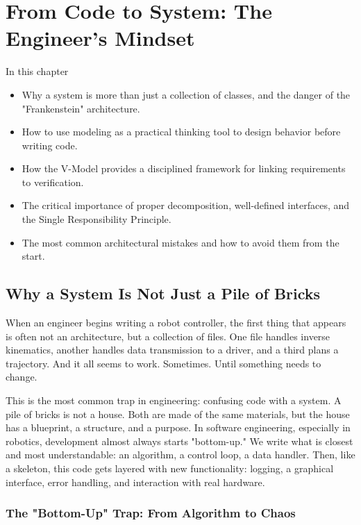 \chapter{From Code to System: The Engineer's Mindset}
\begin{navigationbox}{In this chapter}
    \begin{itemize}
        \item Why a system is more than just a collection of classes, and the danger of the "Frankenstein" architecture.
        \item How to use modeling as a practical thinking tool to design behavior before writing code.
        \item How the V-Model provides a disciplined framework for linking requirements to verification.
        \item The critical importance of proper decomposition, well-defined interfaces, and the Single Responsibility Principle.
        \item The most common architectural mistakes and how to avoid them from the start.
    \end{itemize}
\end{navigationbox}


\section{Why a System Is Not Just a Pile of Bricks}

When an engineer begins writing a robot controller, the first thing that appears is often not an architecture, but a collection of files. One file handles inverse kinematics, another handles data transmission to a driver, and a third plans a trajectory. And it all seems to work. Sometimes. Until something needs to change.

This is the most common trap in engineering: confusing code with a system. A pile of bricks is not a house. Both are made of the same materials, but the house has a blueprint, a structure, and a purpose. In software engineering, especially in robotics, development almost always starts "bottom-up." We write what is closest and most understandable: an algorithm, a control loop, a data handler. Then, like a skeleton, this code gets layered with new functionality: logging, a graphical interface, error handling, and interaction with real hardware.

\subsection{The "Bottom-Up" Trap: From Algorithm to Chaos}

